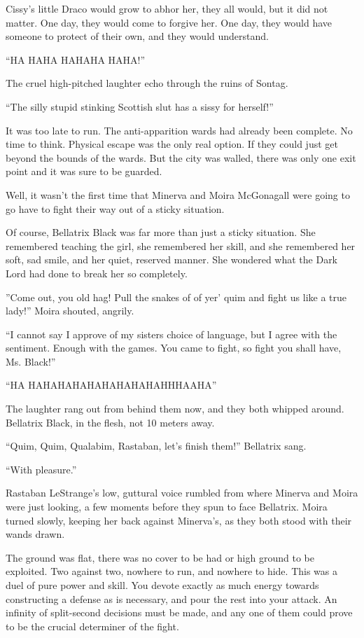 Cissy’s little Draco would grow to abhor her, they all would, but it did not matter. One day, they would come to forgive her. One day, they would have someone to protect of their own, and they would understand.
\simpleline


“HA HAHA HAHAHA HAHA!”

The cruel high-pitched laughter echo through the ruins of Sontag.

“The silly stupid stinking Scottish slut has a sissy for herself!”

It was too late to run. The anti-apparition wards had already been complete. No time to think. Physical escape was the only real option. If they could just get beyond the bounds of the wards. But the city was walled, there was only one exit point and it was sure to be guarded.

Well, it wasn’t the first time that Minerva and Moira McGonagall were going to go have to fight their way out of a sticky situation.

Of course, Bellatrix Black was far more than just a sticky situation. She remembered teaching the girl, she remembered her skill, and she remembered her soft, sad smile, and her quiet, reserved manner. She wondered what the Dark Lord had done to break her so completely.

”Come out, you old hag! Pull the snakes of of yer’ quim and fight us like a true lady!” Moira shouted, angrily.

“I cannot say I approve of my sisters choice of language, but I agree with the sentiment. Enough with the games. You came to fight, so fight you shall have, Ms. Black!”

“HA HAHAHAHAHAHAHAHAHAHHHAAHA”

The laughter rang out from behind them now, and they both whipped around. Bellatrix Black, in the flesh, not 10 meters away.

“Quim, Quim, Qualabim, Rastaban, let’s finish them!” Bellatrix sang.

“With pleasure.”

Rastaban LeStrange’s low, guttural voice rumbled from where Minerva and Moira were just looking, a few moments before they spun to face Bellatrix. Moira turned slowly, keeping her back against Minerva’s, as they both stood with their wands drawn.

The ground was flat, there was no cover to be had or high ground to be exploited. Two against two, nowhere to run, and nowhere to hide. This was a duel of pure power and skill. You devote exactly as much energy towards constructing a defense as is necessary, and pour the rest into your attack. An infinity of split-second decisions must be made, and any one of them could prove to be the crucial determiner of the fight.


